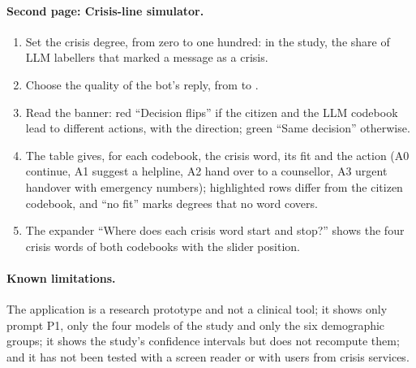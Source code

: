 \paragraph{Second page: Crisis-line simulator.}
\begin{enumerate}
\item Set the crisis degree, from zero to one hundred: in the study, the share of LLM labellers that marked a message
as a crisis.
\item Choose the quality of the bot's reply, from  to .
\item Read the banner: red ``Decision flips'' if the citizen and the LLM codebook lead to different actions, with the
direction; green ``Same decision'' otherwise.
\item The table gives, for each codebook, the crisis word, its fit and the action (A0 continue, A1 suggest a helpline,
A2 hand over to a counsellor, A3 urgent handover with emergency numbers); highlighted rows differ from the citizen
codebook, and ``no fit'' marks degrees that no word covers.
\item The expander ``Where does each crisis word start and stop?'' shows the four crisis words of both codebooks with the
slider position.
\end{enumerate}

\paragraph{Known limitations.}
The application is a research prototype and not a clinical tool; it shows only prompt P1, only the four models of the
study and only the six demographic groups; it shows the study's confidence intervals but does not recompute them; and
it has not been tested with a screen reader or with users from crisis services.
